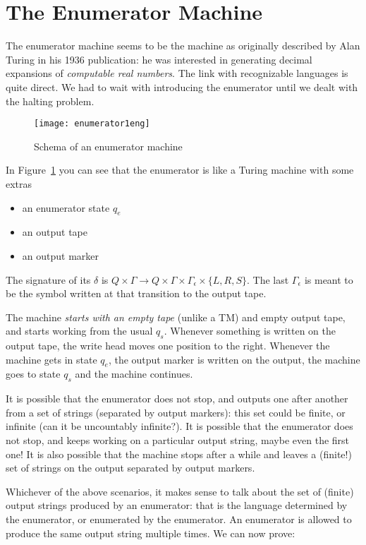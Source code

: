 \section{The Enumerator Machine}\label{enumerator}

The enumerator machine seems to be the machine as originally described
by Alan Turing in his 1936 publication: he was interested in
generating decimal expansions of {\em computable real numbers}. The
link with recognizable languages is quite direct. We had to wait with
introducing the enumerator until we dealt with the halting problem.

\begin{figure}[h]
	\centering
	\texttt{[image: enumerator1eng]}
	\caption{Schema of an enumerator machine\label{enumerator1}}
\end{figure}

In Figure~\ref{enumerator1} you can see that the enumerator is like a
Turing machine with some extras
\begin{itemize}
\item an enumerator state $q_e$
\item an output tape
\item an output marker
\end{itemize}
The signature of its $\delta$ is
%
$Q \times \Gamma \rightarrow Q \times \Gamma \times \Gamma_\epsilon \times \{L,R,S\}$.
The last $\Gamma_\epsilon$ is meant to be the symbol written at that
transition to the output tape.

The machine \emph{starts with an empty tape} (unlike a TM) and empty output tape, and starts working from the
usual $q_s$. Whenever something is written on the
output tape, the write head moves one position to the right. Whenever
the machine gets in state $q_e$, the output marker is written on the
output, the machine goes to state $q_s$ and the machine continues.

It is possible that the enumerator does not stop, and outputs one
after another from a set of strings (separated by output markers):
this set could be finite, or infinite (can it be uncountably
infinite?). It is possible that the enumerator does not stop, and
keeps working on a particular output string, maybe even the first one!
It is also possible that the machine stops after a while and leaves a (finite!) set of strings on
the output separated by output markers.

Whichever of the above scenarios, it makes sense to talk about the set
of (finite) output strings produced by an enumerator: that is the
language determined by the enumerator, or enumerated by the
enumerator. An enumerator is allowed to produce the same output
string multiple times. We can now prove:

